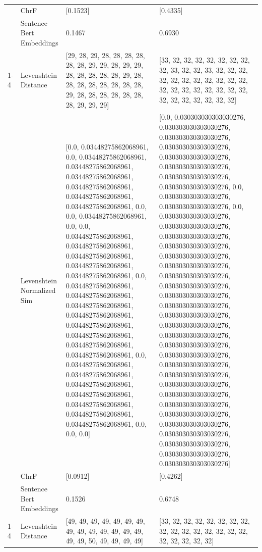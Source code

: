 \begin{tabular}{llll}
 & ChrF & [0.1523] & [0.4335] \\
 & Sentence Bert Embeddings & 0.1467 & 0.6930 \\
\cline{1-4}
\multirow[t]{4}{*}{Ithaga riene rinogagia ngingo} & Levenshtein Distance & [29, 28, 29, 28, 28, 28, 28, 28, 28, 29, 29, 28, 29, 29, 28, 28, 28, 28, 28, 29, 28, 28, 28, 28, 28, 28, 28, 28, 29, 28, 28, 28, 28, 28, 28, 28, 29, 29, 29] & [33, 32, 32, 32, 32, 32, 32, 32, 32, 33, 32, 32, 33, 32, 32, 32, 32, 32, 32, 32, 32, 32, 32, 32, 32, 32, 32, 32, 32, 32, 32, 32, 32, 32, 32, 32, 32, 32, 32] \\
 & Levenshtein Normalized Sim & [0.0, 0.03448275862068961, 0.0, 0.03448275862068961, 0.03448275862068961, 0.03448275862068961, 0.03448275862068961, 0.03448275862068961, 0.03448275862068961, 0.0, 0.0, 0.03448275862068961, 0.0, 0.0, 0.03448275862068961, 0.03448275862068961, 0.03448275862068961, 0.03448275862068961, 0.03448275862068961, 0.0, 0.03448275862068961, 0.03448275862068961, 0.03448275862068961, 0.03448275862068961, 0.03448275862068961, 0.03448275862068961, 0.03448275862068961, 0.03448275862068961, 0.0, 0.03448275862068961, 0.03448275862068961, 0.03448275862068961, 0.03448275862068961, 0.03448275862068961, 0.03448275862068961, 0.03448275862068961, 0.0, 0.0, 0.0] & [0.0, 0.030303030303030276, 0.030303030303030276, 0.030303030303030276, 0.030303030303030276, 0.030303030303030276, 0.030303030303030276, 0.030303030303030276, 0.030303030303030276, 0.0, 0.030303030303030276, 0.030303030303030276, 0.0, 0.030303030303030276, 0.030303030303030276, 0.030303030303030276, 0.030303030303030276, 0.030303030303030276, 0.030303030303030276, 0.030303030303030276, 0.030303030303030276, 0.030303030303030276, 0.030303030303030276, 0.030303030303030276, 0.030303030303030276, 0.030303030303030276, 0.030303030303030276, 0.030303030303030276, 0.030303030303030276, 0.030303030303030276, 0.030303030303030276, 0.030303030303030276, 0.030303030303030276, 0.030303030303030276, 0.030303030303030276, 0.030303030303030276, 0.030303030303030276, 0.030303030303030276, 0.030303030303030276] \\
 & ChrF & [0.0912] & [0.4262] \\
 & Sentence Bert Embeddings & 0.1526 & 0.6748 \\
\cline{1-4}
\multirow[t]{4}{*}{Maundu ni ndiganiro} & Levenshtein Distance & [49, 49, 49, 49, 49, 49, 49, 49, 49, 49, 49, 49, 49, 49, 49, 49, 50, 49, 49, 49, 49] & [33, 32, 32, 32, 32, 32, 32, 32, 32, 32, 32, 32, 32, 32, 32, 32, 32, 32, 32, 32, 32] \\

\end{tabular}
